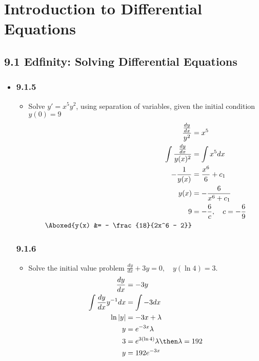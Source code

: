 
\chapter{Introduction to Differential Equations}
\section{9.1 Edfinity: Solving Differential Equations}
\begin{itemize}
  \item[]

  \subsection{9.1.5}
  \begin{itemize}
    \item Solve \( y' = x^5y^2 \), using separation of variables, given the
      initial condition \( y\left( 0 \right) = 9   \)
      \begin{align*}
        \frac{\frac{dy}{dx}}{y^2} &= x^5\\
        \int \frac{\frac{dy}{dx}}{y(x)^2} &= \int x^5 dx \\
        -\frac{1}{y(x)} &= \frac{x^6}{6} + c_1 \\
        y(x) &= -\frac{6}{x^6 + c_1} \\
        9 &= - \frac{6}{c}, \quad c = -\frac{6}{9} \\
        \Aboxed{y(x) &= - \frac{18}{2x^6 - 2}}
      \end{align*}
  \end{itemize}

  \subsection{9.1.6}
  \begin{itemize}
    \item Solve the initial value problem \( \frac{dy}{dx} + 3y = 0,\quad y(\ln 4) =
      3 \).
    \begin{align*}
      \frac{dy}{dx} &= -3y \\
      \int \frac{dy}{dx} y^{-1}dx &= \int -3dx \\
      \ln|y| &= -3x + \lambda \\
      y &= e^{-3x} \lambda \\
      3 &= e^{3(\ln 4)} \lambda \then \lambda = 192 \\
      y &= 192e^{-3x}
    \end{align*}


\end{itemize}
\end{itemize}
